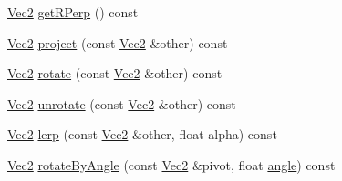 \begin{DoxyCompactItemize}
\item 
\hyperlink{classVec2}{Vec2} \hyperlink{classVec2_a3ae57753954a59e57d1ddaaa76b57485}{get\+R\+Perp} () const
\item 
\hyperlink{classVec2}{Vec2} \hyperlink{classVec2_ad1fc26536c25f01208a26e769c980b8d}{project} (const \hyperlink{classVec2}{Vec2} \&other) const
\item 
\hyperlink{classVec2}{Vec2} \hyperlink{classVec2_a992d4d9ea1c60c30d7a21b8c1f003dcc}{rotate} (const \hyperlink{classVec2}{Vec2} \&other) const
\item 
\hyperlink{classVec2}{Vec2} \hyperlink{classVec2_ac11c32b0ab0aeced26fc5264785b774a}{unrotate} (const \hyperlink{classVec2}{Vec2} \&other) const
\item 
\hyperlink{classVec2}{Vec2} \hyperlink{classVec2_ac0076d01a5bbbaa5718257c24ee93e06}{lerp} (const \hyperlink{classVec2}{Vec2} \&other, float alpha) const
\item 
\hyperlink{classVec2}{Vec2} \hyperlink{classVec2_a1819c9ccc8f632bf0efbd36d0e890ce0}{rotate\+By\+Angle} (const \hyperlink{classVec2}{Vec2} \&pivot, float \hyperlink{classVec2_a8e791a6d3b657e714587295b6fc331b6}{angle}) const
\end{DoxyCompactItemize}
